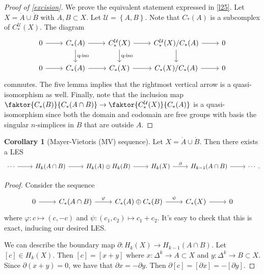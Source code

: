 \documentclass[10pt,letterpaper,cm]{nupset}
\theoremstyle{definition}
\theoremstyle{theorem}
\newtheorem{corollary}[definition]{Corollary}
\theoremstyle{remark}
\newcommand{\U}{\mathcal U}
\newcommand{\1}{\mathbb{1}}
\newcommand{\0}{\vec 0}
\begin{document}
\medskip

\begin{proof}[Proof of \cref{excision}]
We prove the equivalent statement expressed in \cref{l25}. Let $X = \mathring{A}\cup \mathring{B}$ with $A,B\subset X$. Let $\U =\left\{A, B\right\}$. Note that $C_{\ast}(A)$ is a subcomplex of $C_{\ast}^{\U}(X)$. The diagram
\[
\begin{tikzcd}
0 \arrow[r] & C_{\ast}(A) \arrow[r] \arrow[d, "\text{q-iso}"] & C_{\ast}^{\U}(X) \arrow[r] \arrow[d, "\text{q-iso}"] & C_{\ast}^{\U}(X)/C_{\ast}(A) \arrow[r] \arrow[d] & 0 \\
0 \arrow[r] & C_{\ast}(A) \arrow[r]                          & C_{\ast}(X) \arrow[r]                                & C_{\ast}(X)/C_{\ast}(A) \arrow[r]                & 0
\end{tikzcd}
\] commutes. The five lemma implies that the rightmost vertical arrow is a quasi-isomorphism as well. Finally, note that the inclusion map $\faktor{C_{\ast}(B)}{C_{\ast}(A\cap B)} \to \faktor{C_{\ast}^{\U}(X)}{C_{\ast}(A)}$ is a quasi-isomorphism since both the domain and codomain are free groups with basis the singular $n$-simplices in $B$ that are outside $A$.
\end{proof}

\begin{corollary}[Mayer-Vietoris (MV) sequence]
Let $X= \mathring{A} \cup \mathring{B}$. Then there exists a LES 
\[
\begin{tikzcd}
\cdots \arrow[r] & H_k(A\cap B) \arrow[r] & H_k(A)\oplus H_k(B) \arrow[r] & H_k(X) \arrow[r, "\partial"] & H_{k-1}(A\cap B) \arrow[r] & \cdots
\end{tikzcd}
.\]
\end{corollary}
\begin{proof}
Consider the sequence
\[
\begin{tikzcd}
0 \arrow[r] & C_{\ast}(A\cap B) \arrow[r, "\varphi"] & C_{\ast}(A)\oplus C_{\ast}(B) \arrow[r, "\psi"] & C_{\ast}(X) \arrow[r] & 0
\end{tikzcd}
\] where $\varphi : c \mapsto \left(c, {-c}\right)$ and $\psi : \left(c_1, c_2\right) \mapsto c_1 + c_2$. It's easy to check that this is exact, inducing our desired LES.

\medskip

 We can describe the boundary map $\partial : H_k(X) \to H_{k-1}(A\cap B)$. Let $\left[c\right] \in H_k(X)$. Then $\left[c\right] = 
 \left[x+y\right]$ where $x : \Delta^k \to A\subset X$ and $y: \Delta^k \to B\subset X$. Since $\partial(x+y)  =0$, we have that $\partial{x}={-\partial{y}}$. Then $\partial{[c]} =[\partial{x}] = {-[\partial{y}]}$.
\end{proof}
\end{document}
